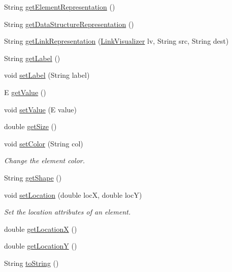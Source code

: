 \begin{DoxyCompactItemize}
\item 
String \mbox{\hyperlink{classbridges_1_1base_1_1_element_a8822450cfaf8495bc955d777ad35ea3f}{get\+Element\+Representation}} ()
\item 
String \mbox{\hyperlink{classbridges_1_1base_1_1_element_ab5e21b5941c018501db2ab41a6fb3823}{get\+Data\+Structure\+Representation}} ()
\item 
String \mbox{\hyperlink{classbridges_1_1base_1_1_element_ae32deb37d1ad95d2fdfaa616062f319d}{get\+Link\+Representation}} (\mbox{\hyperlink{classbridges_1_1base_1_1_link_visualizer}{Link\+Visualizer}} lv, String src, String dest)
\item 
String \mbox{\hyperlink{classbridges_1_1base_1_1_element_a5c831a0238de487765f6021a887f1542}{get\+Label}} ()
\item 
void \mbox{\hyperlink{classbridges_1_1base_1_1_element_a942ccd766aeca0c4fdbe27ef8cbe78d9}{set\+Label}} (String label)
\item 
E \mbox{\hyperlink{classbridges_1_1base_1_1_element_a44ddc61db34b6cf0bab7dfba667d54af}{get\+Value}} ()
\item 
void \mbox{\hyperlink{classbridges_1_1base_1_1_element_ab3cf1241da0bc4c59cea9d6f0fd7aaf4}{set\+Value}} (E value)
\item 
double \mbox{\hyperlink{classbridges_1_1base_1_1_element_add4b836e041e45e0c7a80eb7fd5a229d}{get\+Size}} ()
\item 
void \mbox{\hyperlink{classbridges_1_1base_1_1_element_a336f2ff70a0873fde6f0b8a43b670ffc}{set\+Color}} (String col)
\begin{DoxyCompactList}\small\item\em Change the element color. \end{DoxyCompactList}\item 
String \mbox{\hyperlink{classbridges_1_1base_1_1_element_aa0fe02d2f5491cf21cc6741f592536a8}{get\+Shape}} ()
\item 
void \mbox{\hyperlink{classbridges_1_1base_1_1_element_a0fe9a52d06e8f3ccc8521e155ec72a27}{set\+Location}} (double locX, double locY)
\begin{DoxyCompactList}\small\item\em Set the location attributes of an element. \end{DoxyCompactList}\item 
double \mbox{\hyperlink{classbridges_1_1base_1_1_element_a57cc1611e0d9cbec9da30d1cdcd3b23d}{get\+LocationX}} ()
\item 
double \mbox{\hyperlink{classbridges_1_1base_1_1_element_a3cfd6af5ca4cae0596845f62018ce004}{get\+LocationY}} ()
\item 
String \mbox{\hyperlink{classbridges_1_1base_1_1_element_a7dc685e317fd9dc2e73e049a9f907e42}{to\+String}} ()
\end{DoxyCompactItemize}
